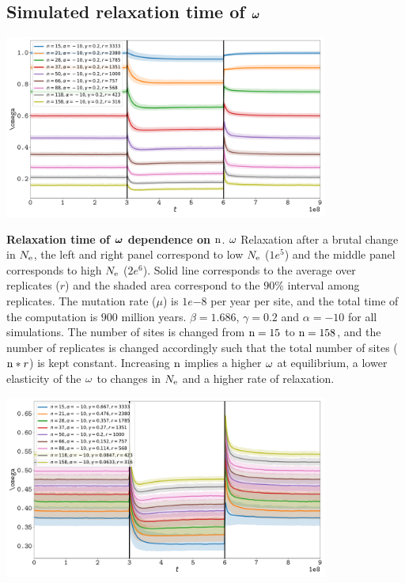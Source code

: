 \documentclass{article}
\begin{document}
\subsection{Simulated relaxation time of $\bm{\omega}$}
\begin{center}
 \includegraphics[width=0.8\textwidth] {artworks/Relaxation-Stability.pdf}
\end{center}
\textbf{Relaxation time of $\bm{\omega}$ dependence on $\text{n}$}.
$\omega$ Relaxation after a brutal change in $N_{\mathrm{e}}$, the left and right panel correspond to low $N_{\mathrm{e}}$ ($1e^{5}$) and the middle panel corresponds to high $N_{\mathrm{e}}$ ($2e^{6}$). 
Solid line corresponds to the average over replicates ($r$) and the shaded area correspond to the $90\%$ interval among replicates. 
The mutation rate ($\mu$) is $1e{-8}$ per year per site, and the total time of the computation is $900$ million years.
$\beta=1.686$, $\gamma=0.2$ and $\alpha=-10$ for all simulations. The number of sites is changed from $\text{n}=15$ to $\text{n}=158$, and the number of replicates is changed accordingly such that the total number of sites ($\text{n}*r$) is kept constant.
Increasing $\text{n}$ implies a higher $\omega$ at equilibrium, a lower elasticity of the $\omega$ to changes in $N_{\mathrm{e}}$ and a higher rate of relaxation.
\begin{center}
 \includegraphics[width=0.8\textwidth] {artworks/Relaxation-Stability-Gamma.pdf}
\end{center}
\end{document}
